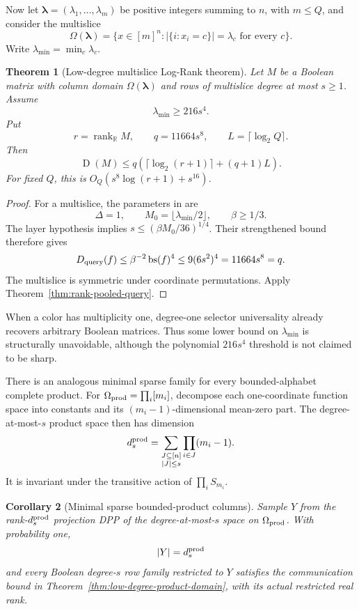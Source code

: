 \documentclass[11pt]{article}
\newtheorem{theorem}{Theorem}[section]
\newtheorem{corollary}[theorem]{Corollary}
\theoremstyle{definition}
\theoremstyle{remark}
\newcommand{\R}{\mathbb R}
\newcommand{\1}{\mathbf 1}
\newcommand{\rank}{\operatorname{rank}}
\newcommand{\Dcc}{\operatorname{D}}
\begin{document}
Now let $\boldsymbol\lambda=(\lambda_1,\ldots,\lambda_m)$ be positive
integers summing to $n$, with $m\le Q$, and consider the multislice
\[
 \Omega(\boldsymbol\lambda)
 =\{x\in[m]^n:|\{i:x_i=c\}|=\lambda_c\text{ for every }c\}.
\]
Write $\lambda_{\min}=\min_c\lambda_c$.

\begin{theorem}[Low-degree multislice Log-Rank theorem]
\label{thm:low-degree-multislice}
Let $M$ be a Boolean matrix with column domain
$\Omega(\boldsymbol\lambda)$ and rows of multislice degree at most $s\ge1$.
Assume
\[
 \lambda_{\min}\ge216s^4.
\]
Put
\[
 r=\rank_{\R}M,
 \qquad q=11664s^8,
 \qquad L=\lceil\log_2Q\rceil.
\]
Then
\[
 \Dcc(M)\le
 q\left(\lceil\log_2(r+1)\rceil+(q+1)L\right).
\]
For fixed $Q$, this is
$O_Q(s^8\log(r+1)+s^{16})$.
\end{theorem}

\begin{proof}
For a multislice, the parameters in
\cite[Theorem~3.1 and Section~4.3]{DafniFilmusLifshitzLindzeyVinyals} are
\[
 \Delta=1,
 \qquad M_0=\lfloor\lambda_{\min}/2\rfloor,
 \qquad \beta\ge1/3.
\]
The layer hypothesis implies
$s\le(\beta M_0/36)^{1/4}$.  Their strengthened bound therefore gives
\[
 D_{\rm query}(f)
 \le\beta^{-2}\operatorname{bs}(f)^4
 \le9(6s^2)^4=11664s^8=q.
\]
The multislice is symmetric under coordinate permutations.  Apply
Theorem~\ref{thm:rank-pooled-query}.
\end{proof}

When a color has multiplicity one, degree-one selector universality already
recovers arbitrary Boolean matrices.  Thus some lower bound on
$\lambda_{\min}$ is structurally unavoidable, although the polynomial
$216s^4$ threshold is not claimed to be sharp.

There is an analogous minimal sparse family for every bounded-alphabet
complete product.  For
$\Omega_{\rm prod}=\prod_i[m_i]$, decompose each one-coordinate function
space into constants and its $(m_i-1)$-dimensional mean-zero part.  The
degree-at-most-$s$ product space then has dimension
\begin{equation}\label{eq:product-degree-dimension}
 d_s^{\rm prod}
 =\sum_{\substack{J\subseteq[n]\\|J|\le s}}
   \prod_{i\in J}(m_i-1).
\end{equation}
It is invariant under the transitive action of $\prod_iS_{m_i}$.

\begin{corollary}[Minimal sparse bounded-product columns]
\label{cor:dpp-product}
Sample $Y$ from the rank-$d_s^{\rm prod}$ projection DPP of the
degree-at-most-$s$ space on $\Omega_{\rm prod}$.  With probability one,
\[
 |Y|=d_s^{\rm prod}
\]
and every Boolean degree-$s$ row family restricted to $Y$ satisfies the
communication bound in Theorem~\ref{thm:low-degree-product-domain}, with its
actual restricted real rank.
\end{corollary}
\end{document}
